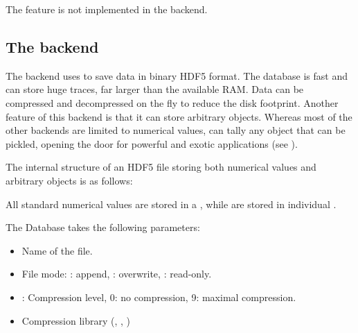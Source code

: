 \documentclass[]{jss}
\begin{document}
The  feature is not implemented in the  backend.



\subsection[hdf5]{The  backend}
  \label{hdf5}%


The  backend uses  to save data in binary HDF5 format.
The  database is fast and can store huge traces, far larger than the
available RAM. Data can be compressed and decompressed on the fly to
reduce the disk footprint.
Another feature of this backend is that it can store arbitrary objects.
Whereas most of the other backends are limited to numerical values, 
can tally any object that can be pickled, opening the door for powerful and
exotic applications (see ).

The internal structure of an HDF5 file storing both numerical values and
arbitrary objects is as follows:
%

All standard numerical values are stored in a , while 
are stored in individual .

The  Database takes the following parameters:
%
\begin{itemize}

\item {} Name of the  file.

\item {} File mode: : append, : overwrite,
: read-only.

\item {} : Compression level, 0: no compression, 9: maximal compression.

\item {} Compression library (, , )

\end{itemize}
\end{document}
